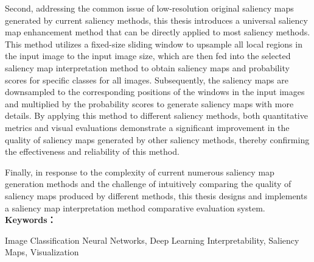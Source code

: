 Second, addressing the common issue of low-resolution original saliency maps generated by current saliency methods, this thesis introduces a universal saliency map enhancement method that can be directly applied to most saliency methods. This method utilizes a fixed-size sliding window to upsample all local regions in the input image to the input image size, which are then fed into the selected saliency map interpretation method to obtain saliency maps and probability scores for specific classes for all images. Subsequently, the saliency maps are downsampled to the corresponding positions of the windows in the input images and multiplied by the probability scores to generate saliency maps with more details. By applying this method to different saliency methods, both quantitative metrics and visual evaluations demonstrate a significant improvement in the quality of saliency maps generated by other saliency methods, thereby confirming the effectiveness and reliability of this method.

Finally, in response to the complexity of current numerous saliency map generation methods and the challenge of intuitively comparing the quality of saliency maps produced by different methods, this thesis designs and implements a saliency map interpretation method comparative evaluation system.
\\

\noindent\textbf{Keywords：} 
\begin{minipage}[t]{0.85\linewidth}
	Image Classification Neural Networks, Deep Learning Interpretability, Saliency Maps, Visualization
\end{minipage}

\clearpage